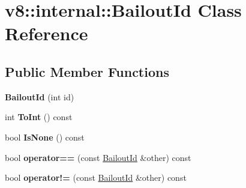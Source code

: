 \hypertarget{classv8_1_1internal_1_1_bailout_id}{}\section{v8\+:\+:internal\+:\+:Bailout\+Id Class Reference}
\label{classv8_1_1internal_1_1_bailout_id}
\subsection*{Public Member Functions}
\begin{DoxyCompactItemize}
\item 
\hypertarget{classv8_1_1internal_1_1_bailout_id_a29bee41095d1f83d33c1e519877b324e}{}{\bfseries Bailout\+Id} (int id)\label{classv8_1_1internal_1_1_bailout_id_a29bee41095d1f83d33c1e519877b324e}

\item 
\hypertarget{classv8_1_1internal_1_1_bailout_id_a28600772827dde89522328e18caaef0c}{}int {\bfseries To\+Int} () const \label{classv8_1_1internal_1_1_bailout_id_a28600772827dde89522328e18caaef0c}

\item 
\hypertarget{classv8_1_1internal_1_1_bailout_id_abaa5f387538060e4229834dd611b8a17}{}bool {\bfseries Is\+None} () const \label{classv8_1_1internal_1_1_bailout_id_abaa5f387538060e4229834dd611b8a17}

\item 
\hypertarget{classv8_1_1internal_1_1_bailout_id_ad56f5e5bca475897e778003958c1fc8a}{}bool {\bfseries operator==} (const \hyperlink{classv8_1_1internal_1_1_bailout_id}{Bailout\+Id} \&other) const \label{classv8_1_1internal_1_1_bailout_id_ad56f5e5bca475897e778003958c1fc8a}

\item 
\hypertarget{classv8_1_1internal_1_1_bailout_id_a70b9c565a2c63cb954189ed581767f36}{}bool {\bfseries operator!=} (const \hyperlink{classv8_1_1internal_1_1_bailout_id}{Bailout\+Id} \&other) const \label{classv8_1_1internal_1_1_bailout_id_a70b9c565a2c63cb954189ed581767f36}

\end{DoxyCompactItemize}
